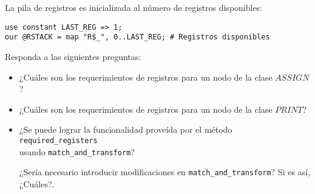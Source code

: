 La pila de registros es inicializada al número de registros disponibles:

\begin{verbatim}
use constant LAST_REG => 1;
our @RSTACK = map "R$_", 0..LAST_REG; # Registros disponibles
\end{verbatim}

\begin{exercise}
Responda a las siguientes preguntas:

\begin{itemize}
\item
¿Cuáles son los requerimientos de registros para un nodo de la clase $ASSIGN$?
\item
¿Cuáles son los requerimientos de registros para un nodo de la clase $PRINT$?
\item
¿Se puede lograr la funcionalidad proveída por el método 
\verb|required_registers|\\
usando \verb|match_and_transform|? 

¿Sería necesario introducir modificaciones
en \verb|match_and_transform|? Si es así, ¿Cuáles?.
\end{itemize}
\end{exercise}

